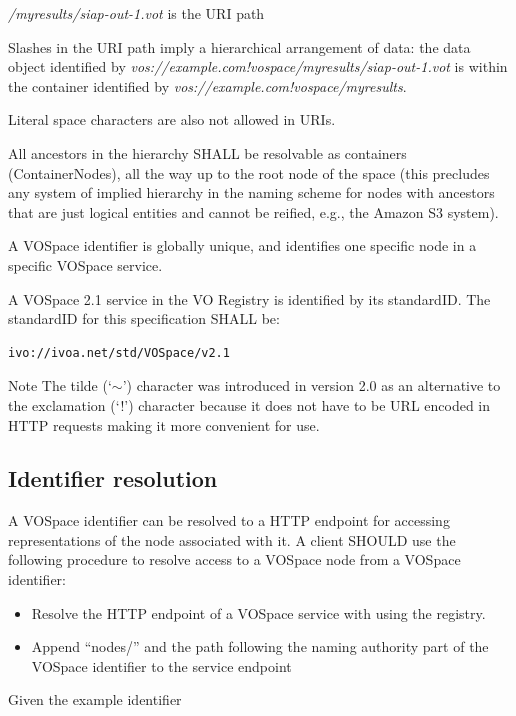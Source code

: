 \documentclass[11pt,a4paper]{ivoa}
\begin{document}
\emph{/myresults/siap-out-1.vot} is the URI path

Slashes in the URI path imply a hierarchical arrangement of data: the data object identified by \emph{vos://example.com!vospace/myresults/siap-out-1.vot} is within the container identified by \emph{vos://example.com!vospace/myresults}.

Literal space characters are also not allowed in URIs.

All ancestors in the hierarchy SHALL be resolvable as containers (ContainerNodes), all the way up to the root node of the space (this precludes any system of implied hierarchy in the naming scheme for nodes with ancestors that are just logical entities and cannot be reified, e.g., the Amazon S3 system).

A VOSpace identifier is globally unique, and identifies one specific node in a specific VOSpace service.

A VOSpace 2.1 service in the VO Registry is identified by its standardID.  The standardID for this specification SHALL be:
\begin{verbatim}
ivo://ivoa.net/std/VOSpace/v2.1
\end{verbatim}

\begin{admonition}{Note}
The tilde (`$\mathtt{\sim}$') character was introduced in version 2.0 as an alternative to the exclamation (`!') character because it does not have to be URL encoded in HTTP requests making it more convenient for use.
\end{admonition}

\subsection{Identifier resolution}
\label{subsec:identifier resolution}
A VOSpace identifier can be resolved to a HTTP endpoint for accessing representations of the node associated with it. A client SHOULD use the following procedure to resolve access to a VOSpace node from a VOSpace identifier:

\begin{itemize}
    \item Resolve the HTTP endpoint of a VOSpace service with using the registry.  
    \item Append ``nodes/'' and the path following the naming authority part of the VOSpace identifier to the service endpoint
\end{itemize}

\noindent
Given the example identifier
\end{document}
